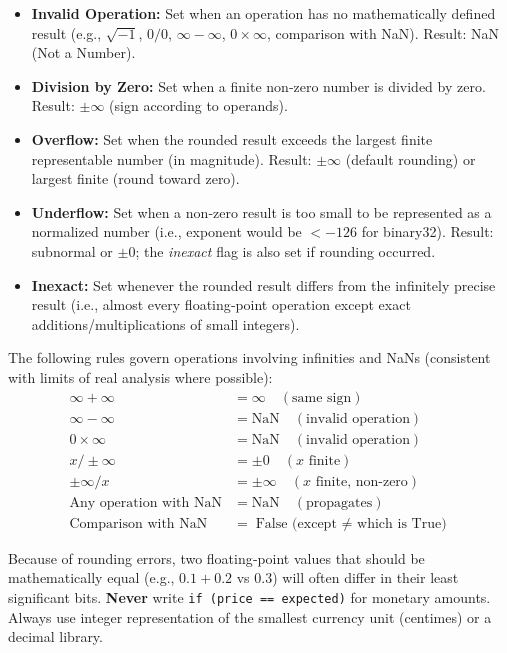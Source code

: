 \documentclass[11pt]{article}
\newcommand{\cle}[1]{{\popxbold\color{popdark}#1}}
\begin{document}
\begin{definition}
\begin{itemize}
\item \textbf{Invalid Operation:} Set when an operation has no mathematically defined result (e.g., $\sqrt{-1}$, $0/0$, $\infty - \infty$, $0 \times \infty$, comparison with NaN). Result: \cle{NaN} (Not a Number).
\item \textbf{Division by Zero:} Set when a finite non‑zero number is divided by zero. Result: $\pm\infty$ (sign according to operands).
\item \textbf{Overflow:} Set when the rounded result exceeds the largest finite representable number (in magnitude). Result: $\pm\infty$ (default rounding) or largest finite (round toward zero).
\item \textbf{Underflow:} Set when a non‑zero result is too small to be represented as a normalized number (i.e., exponent would be $< -126$ for binary32). Result: subnormal or $\pm 0$; the \emph{inexact} flag is also set if rounding occurred.
\item \textbf{Inexact:} Set whenever the rounded result differs from the infinitely precise result (i.e., almost every floating‑point operation except exact additions/multiplications of small integers).
\end{itemize}
\end{definition}

\begin{propriete}
The following rules govern operations involving infinities and NaNs (consistent with limits of real analysis where possible):
\begin{align*}
\infty + \infty &= \infty \quad (\text{same sign}) \\
\infty - \infty &= \text{NaN} \quad (\text{invalid operation}) \\
0 \times \infty &= \text{NaN} \quad (\text{invalid operation}) \\
x / \pm\infty &= \pm 0 \quad (x \text{ finite}) \\
\pm\infty / x &= \pm\infty \quad (x \text{ finite, non-zero}) \\
\text{Any operation with NaN} &= \text{NaN} \quad (\text{propagates}) \\
\text{Comparison with NaN} &= \text{False (except $\neq$ which is True)}
\end{align*}
\end{propriete}

\begin{attention}
Because of rounding errors, two floating‑point values that should be mathematically equal (e.g., $0.1 + 0.2$ vs $0.3$) will often differ in their least significant bits. \textbf{Never} write \texttt{if (price == expected)} for monetary amounts. Always use integer representation of the smallest currency unit (centimes) or a decimal library.
\end{attention}
\end{document}
